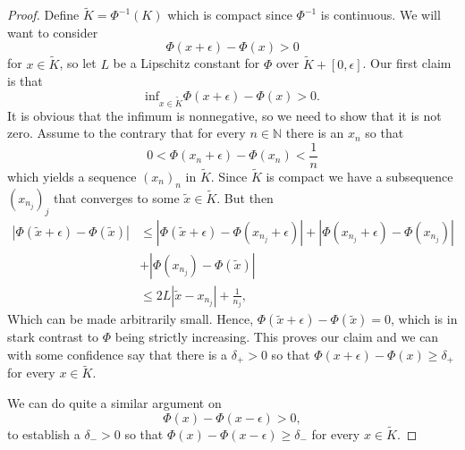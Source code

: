 \documentclass[11pt, a4paper]{article}
\begin{document}
\begin{appendix}
\begin{proof}
Define $\tilde{K} = \Phi^{-1}(K)$ which is compact since $\Phi^{-1}$ is continuous. We will want to consider
\begin{equation*}
\Phi(x+\epsilon) - \Phi(x) > 0
\end{equation*}
for $x \in \tilde{K}$, so let $L$ be a Lipschitz constant for $\Phi$ over $\tilde{K}+[0,\epsilon]$. Our first claim is that
\begin{equation*}
\mathrm{inf}_{x \in \tilde{K}} \Phi(x+\epsilon) - \Phi(x) > 0.
\end{equation*}
It is obvious that the infimum is nonnegative, so we need to show that it is not zero. Assume to the contrary that for every $n \in \mathbb{N}$ there is an $x_n$ so that
\begin{equation*}
0 < \Phi(x_n + \epsilon) - \Phi(x_n) < \frac{1}{n}
\end{equation*}
which yields a sequence $(x_n)_n$ in $\tilde{K}$. Since $\tilde{K}$ is compact we have a subsequence $(x_{n_j})_j$ that converges to some $ \tilde{x} \in \tilde{K}$. But then
\begin{align*}
|\Phi(\tilde{x} + \epsilon) - \Phi(\tilde{x})| & \leq |\Phi(\tilde{x}+\epsilon) - \Phi(x_{n_j} + \epsilon)| + |\Phi(x_{n_j}+\epsilon) - \Phi(x_{n_j})| \\
&+ |\Phi(x_{n_j}) - \Phi(\tilde{x})| \\
&\leq 2L|\tilde{x}-x_{n_j}| + \frac{1}{n_j},
\end{align*}
Which can be made arbitrarily small. Hence, $\Phi(\tilde{x}+\epsilon) - \Phi(\tilde{x}) = 0$, which is in stark contrast to $\Phi$ being strictly increasing. This proves our claim and we can with some confidence say that there is a $\delta_+>0$ so that $\Phi(x+\epsilon) - \Phi(x) \geq \delta_+$ for every $x \in \tilde{K}$.

We can do quite a similar argument on
\begin{equation*}
\Phi(x) - \Phi(x-\epsilon) > 0,
\end{equation*}
to establish a $\delta_- > 0$ so that $\Phi(x) - \Phi(x-\epsilon) \geq \delta_-$ for every $x\in \tilde{K}$.


\end{proof}
\end{appendix}
\end{document}
